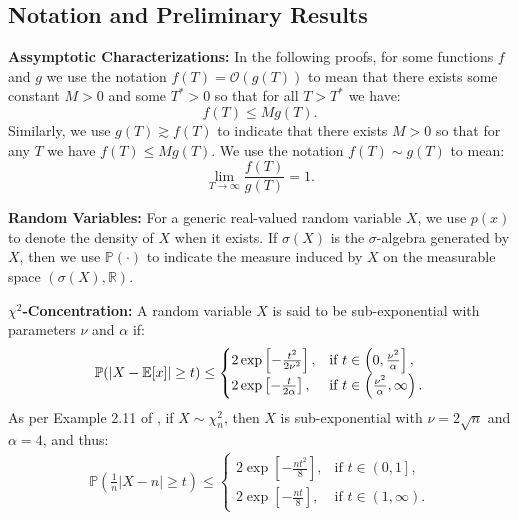 \subsection{Notation and Preliminary Results}
\label{app:localization-smcp}

\textbf{Assymptotic Characterizations:} In the following proofs, for some functions $f$ and $g$ we use the notation $f(T) = \mathcal{O}(g(T))$ to mean that there exists some constant $M > 0$ and some $T^* > 0$ so that for all $T > T^*$ we have: $$f(T) \leq M g(T).$$ Similarly, we use $g(T) \gtrsim f(T)$ to indicate that there exists $M > 0$ so that for any $T$ we have $f(T) \leq M g(T).$ We use the notation $f(T) \sim g(T)$ to mean: $$\lim_{T\to\infty} \frac{f(T)}{g(T)} = 1.$$ 

\textbf{Random Variables:} For a generic real-valued random variable $X$, we use $p(x)$ to denote the density of $X$ when it exists. If $\sigma(X)$ is the $\sigma$-algebra generated by $X$, then we use $\mathbb{P}(\cdot)$ to indicate the measure induced by $X$ on the measurable space $(\sigma(X), \mathbb{R})$.

\textbf{$\chi^2$-Concentration:} A random variable $X$ is said to be sub-exponential with parameters $\nu$ and $\alpha$ if:
\begin{align*}
    \mathbb{P}(|X - \mathbb{E}[x]| \geq t) \leq 
    \begin{cases}
        2 \exp\left[-\frac{t^2}{2\nu^2}\right], & \text{if } t \in \left(0, \frac{\nu^2}{\alpha}\right], \\
        2 \exp\left[-\frac{t}{2\alpha}\right], & \text{if } t \in \left(\frac{\nu^2}{\alpha}, \infty\right).
    \end{cases}
\end{align*}
As per Example 2.11 of \cite{Wainwright19}, if $X \sim \chi^2_n$, then $X$ is sub-exponential with $\nu = 2\sqrt{n}$ and $\alpha = 4$, and thus: 
\begin{align} \label{eq:chi2-ineq}
    \mathbb{P}\left(\frac{1}{n}|X - n| \geq t\right) \leq 
    \begin{cases}
        2 \exp\left[-\frac{n t^2}{8}\right], & \text{if } t \in \left(0, 1\right], \\
        2 \exp\left[-\frac{n t}{8}\right], & \text{if } t \in \left(1, \infty\right).
    \end{cases}
\end{align}